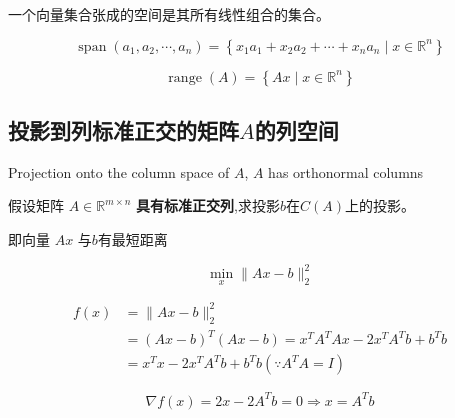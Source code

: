 \begin{definition}[向量集合张成的空间]
    一个向量集合张成的空间是其所有线性组合的集合。

    \begin{equation} \operatorname{span}\left(a_{1}, a_{2}, \cdots, a_{n}\right)=\left\{x_{1} a_{1}+x_{2} a_{2}+\cdots+x_{n} a_{n} \mid x \in \mathbb{R}^{n}\right\} \end{equation}
\end{definition}

\begin{definition}
    \begin{equation} \operatorname{range}(A)=\left\{A x \mid x \in \mathbb{R}^{n}\right\} \end{equation}
\end{definition}

\subsection{投影到列标准正交的矩阵$A$的列空间}
\label{chap:projection-onto-a}


\begin{FigureCenter}{Projection onto the column space of $A$, $A$ has orthonormal columns}
    

\end{FigureCenter}


\begin{problem}
    假设矩阵 $ A \in \mathbb{R}^{m \times n} $ \textbf{具有标准正交列},求投影$b$在$C(A)$上的投影。
\end{problem}

即向量 $ A x $ 与$b$有最短距离

\begin{equation}
\min _{x}\|A x-b\|_{2}^{2}
\end{equation}

\begin{equation} \begin{aligned} f(x) &=\|A x-b\|_{2}^{2}
    \\ & =(A x-b)^{T}(A x-b)=x^{T} A^{T} A x-2 x^{T} A^{T} b+b^{T} b \\ &=x^{T} x-2 x^{T} A^{T} b+b^{T} b\left(\because A^{T} A=I\right) \end{aligned} \end{equation}

\begin{equation} \nabla f(x)=2 x-2 A^{T} b=0 \Rightarrow x=A^{T} b \end{equation}

